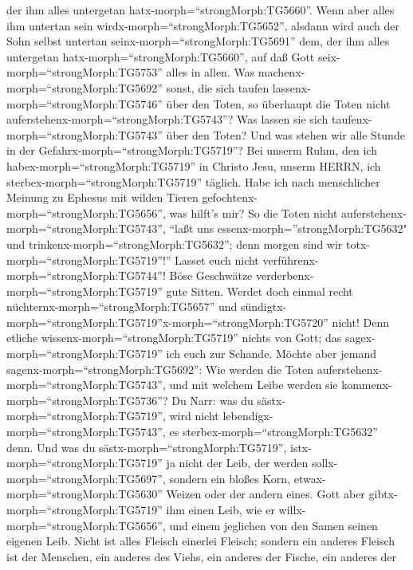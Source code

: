 der ihm alles untergetan hatx-morph=``strongMorph:TG5660''.
 Wenn aber alles ihm untertan sein
wirdx-morph=``strongMorph:TG5652'', alsdann wird auch der Sohn selbst
untertan seinx-morph=``strongMorph:TG5691'' dem, der ihm alles
untergetan hatx-morph=``strongMorph:TG5660'', auf daß Gott
seix-morph=``strongMorph:TG5753'' alles in allen.  Was
machenx-morph=``strongMorph:TG5692'' sonst, die sich taufen
lassenx-morph=``strongMorph:TG5746'' über den Toten, so überhaupt die
Toten nicht auferstehenx-morph=``strongMorph:TG5743''? Was lassen sie
sich taufenx-morph=``strongMorph:TG5743'' über den Toten? 
Und was stehen wir alle Stunde in der
Gefahrx-morph=``strongMorph:TG5719''?  Bei unserm Ruhm, den
ich habex-morph=``strongMorph:TG5719'' in Christo Jesu, unserm HERRN,
ich sterbex-morph=``strongMorph:TG5719'' täglich.  Habe ich
nach menschlicher Meinung zu Ephesus mit wilden Tieren
gefochtenx-morph=``strongMorph:TG5656'', was hilft's mir? So die Toten
nicht auferstehenx-morph=``strongMorph:TG5743'', ``laßt uns
essenx-morph=''strongMorph:TG5632" und
trinkenx-morph=``strongMorph:TG5632''; denn morgen sind wir
totx-morph=``strongMorph:TG5719''!''  Lasset euch nicht
verführenx-morph=``strongMorph:TG5744''! Böse Geschwätze
verderbenx-morph=``strongMorph:TG5719'' gute Sitten. 
Werdet doch einmal recht nüchternx-morph=``strongMorph:TG5657'' und
sündigtx-morph=``strongMorph:TG5719''\textbar x-morph=``strongMorph:TG5720''
nicht! Denn etliche wissenx-morph=``strongMorph:TG5719'' nichts von
Gott; das sagex-morph=``strongMorph:TG5719'' ich euch zur Schande.
 Möchte aber jemand sagenx-morph=``strongMorph:TG5692'':
Wie werden die Toten auferstehenx-morph=``strongMorph:TG5743'', und mit
welchem Leibe werden sie kommenx-morph=``strongMorph:TG5736''?
 Du Narr: was du sästx-morph=``strongMorph:TG5719'', wird
nicht lebendigx-morph=``strongMorph:TG5743'', es
sterbex-morph=``strongMorph:TG5632'' denn.  Und was du
sästx-morph=``strongMorph:TG5719'', istx-morph=``strongMorph:TG5719'' ja
nicht der Leib, der werden sollx-morph=``strongMorph:TG5697'', sondern
ein bloßes Korn, etwax-morph=``strongMorph:TG5630'' Weizen oder der
andern eines.  Gott aber gibtx-morph=``strongMorph:TG5719''
ihm einen Leib, wie er willx-morph=``strongMorph:TG5656'', und einem
jeglichen von den Samen seinen eigenen Leib.  Nicht ist
alles Fleisch einerlei Fleisch; sondern ein anderes Fleisch ist der
Menschen, ein anderes des Viehs, ein anderes der Fische, ein anderes der
